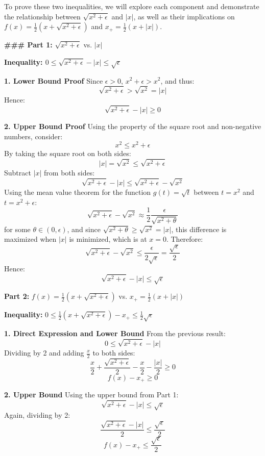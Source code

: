 \documentclass[8pt]{article}
\begin{document}
To prove these two inequalities, we will explore each component and demonstrate the relationship between \( \sqrt{x^2 + \epsilon} \) and \( |x| \), as well as their implications on \( f(x) = \frac{1}{2} (x + \sqrt{x^2 + \epsilon}) \) and \( x_+ = \frac{1}{2} (x + |x|) \).

\textbf{### Part 1:} \( \sqrt{x^2 + \epsilon} \) vs. \( |x| \)

\textbf{Inequality: \( 0 \leq \sqrt{x^2 + \epsilon} - |x| \leq \sqrt{\epsilon} \)}

\textbf{1. Lower Bound Proof}
   Since \(\epsilon > 0\), \( x^2 + \epsilon > x^2 \), and thus:
   \[ \sqrt{x^2 + \epsilon} > \sqrt{x^2} = |x| \]
   Hence:
   \[ \sqrt{x^2 + \epsilon} - |x| \geq 0 \]

\textbf{2. Upper Bound Proof}
   Using the property of the square root and non-negative numbers, consider:
   \[ x^2 \leq x^2 + \epsilon \]
   By taking the square root on both sides:
   \[ |x| = \sqrt{x^2} \leq \sqrt{x^2 + \epsilon} \]
   Subtract \( |x| \) from both sides:
   \[ \sqrt{x^2 + \epsilon} - |x| \leq \sqrt{x^2 + \epsilon} - \sqrt{x^2} \]
   Using the mean value theorem for the function \( g(t) = \sqrt{t} \) between \( t = x^2 \) and \( t = x^2 + \epsilon \):
   \[ \sqrt{x^2 + \epsilon} - \sqrt{x^2} \approx \frac{1}{2} \frac{\epsilon}{\sqrt{x^2 + \theta}} \]
   for some \( \theta \in (0, \epsilon) \), and since \( \sqrt{x^2 + \theta} \geq \sqrt{x^2} = |x| \), this difference is maximized when \( |x| \) is minimized, which is at \( x = 0 \). Therefore:
   \[ \sqrt{x^2 + \epsilon} - \sqrt{x^2} \leq \frac{\epsilon}{2\sqrt{\epsilon}} = \frac{\sqrt{\epsilon}}{2} \]
   Hence:
   \[ \sqrt{x^2 + \epsilon} - |x| \leq \sqrt{\epsilon} \]

\textbf{Part 2:} \( f(x) = \frac{1}{2} (x + \sqrt{x^2 + \epsilon}) \) vs. \( x_+ = \frac{1}{2} (x + |x|) \)

\textbf{Inequality:} \( 0 \leq \frac{1}{2} (x + \sqrt{x^2 + \epsilon}) - x_+ \leq \frac{1}{2} \sqrt{\epsilon} \)

\textbf{1. Direct Expression and Lower Bound}
   From the previous result:
   \[ 0 \leq \sqrt{x^2 + \epsilon} - |x| \]
   Dividing by 2 and adding \( \frac{x}{2} \) to both sides:
   \[ \frac{x}{2} + \frac{\sqrt{x^2 + \epsilon}}{2} - \frac{x}{2} - \frac{|x|}{2} \geq 0 \]
   \[ f(x) - x_+ \geq 0 \]

\textbf{2. Upper Bound}
   Using the upper bound from Part 1:
   \[ \sqrt{x^2 + \epsilon} - |x| \leq \sqrt{\epsilon} \]
   Again, dividing by 2:
   \[ \frac{\sqrt{x^2 + \epsilon} - |x|}{2} \leq \frac{\sqrt{\epsilon}}{2} \]
   \[ f(x) - x_+ \leq \frac{\sqrt{\epsilon}}{2} \]
\end{document}
